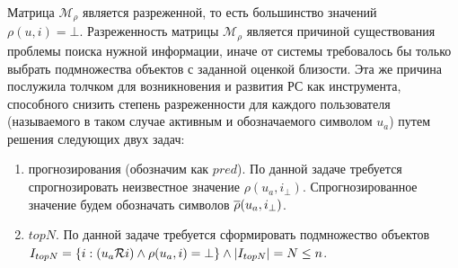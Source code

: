 Матрица
$\mathcal{M}_{\rho}$ является разреженной, то есть большинство
значений \\ $\rho(u, i) = \bot$.
Разреженность матрицы $\mathcal{M}_{\rho}$ является причиной
существования проблемы поиска нужной информации, иначе от системы требовалось
бы только выбрать подмножества объектов с заданной оценкой близости. Эта же
причина послужила толчком для
возникновения и развития РС как инструмента, способного снизить степень
разреженности для каждого пользователя (называемого в таком случае активным
и обозначаемого символом $u_a$) путем решения следующих двух задач:
\begin{enumerate}
	\item прогнозирования (обозначим как $pred$). По данной задаче требуется
		спрогнозировать неизвестное значение $\rho(u_a, i_{\bot})$.
		Спрогнозированное значение будем обозначать символов $\overline{\rho}(u_a,
		i_{\bot})$.

\item $topN$. По данной задаче требуется сформировать подмножество объектов
	$I_{topN} = \{i: (u_a \mathcal{R} i) \wedge \rho(u_a, i) = \bot\}
		\wedge |I_{topN}| = N \le n$.
\end{enumerate}


